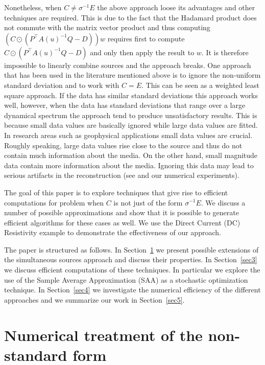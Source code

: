 \documentclass[12pt]{article}
\begin{document}
Nonetheless, when $C \not= \sigma^{-1}E$ the above approach loose its advantages and other techniques are required. This is due to the fact that the Hadamard product does not commute with the matrix vector product and thus computing $(C \odot (P^{\top}A(u)^{-1}Q - D))w$ requires first to compute $C \odot (P^{\top}A(u)^{-1}Q - D)$ and only then apply the result to $w$. It is therefore impossible to linearly combine sources and the approach  breaks. One approach that has been used in the literature mentioned above is to ignore the non-uniform standard deviation and to work with $C=E$. This can be seen as a weighted least square approach. If the data has similar standard deviations this approach works well, however, when the data has standard deviations that range over a large dynamical spectrum the approach tend to produce unsatisfactory results. This is because small data values are basically ignored while large data values are fitted. In research areas such as geophysical applications small data values are crucial. Roughly speaking, large data values rise close to the source and thus do not contain much information about the media. On the other hand, small magnitude data contain more information about the media. Ignoring  this data may lead to serious artifacts in the reconstruction (see \cite{parker,taran} and our numerical experiments).

The goal of this paper is to explore techniques that give rise to efficient computations for problem when $C$ is not just of the form $\sigma^{-1} E$. We discuss a number of possible approximations and show that it is possible to generate efficient algorithms for these cases as well. We use the Direct Current (DC) Resistivity example to demonstrate the effectiveness of our approach.

The paper is structured as follows. In Section~\ref{sec2} we present possible extensions of the simultaneous sources approach and discuss their properties. In Section~\ref{sec3} we discuss efficient computations of these techniques. In particular we explore the use of the Sample Average Approximation (SAA) as a stochastic optimization technique. In Section~\ref{sec4} we investigate the numerical efficiency of the different approaches and we summarize our work in Section~\ref{sec5}.

\section{Numerical treatment of the non-standard form}
\label{sec2}
\end{document}
